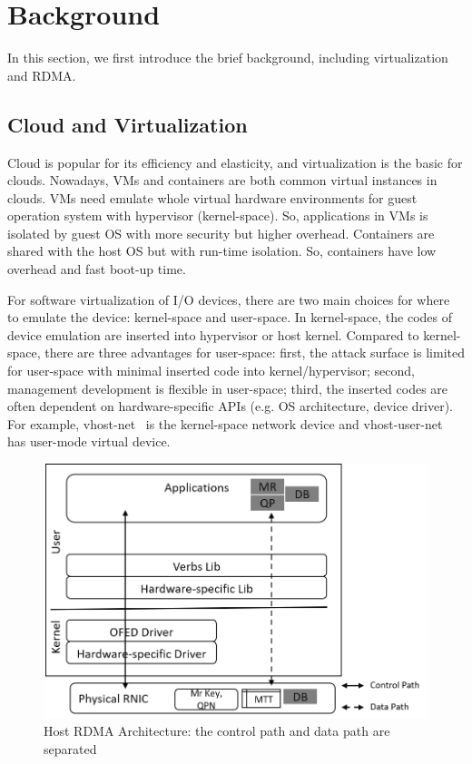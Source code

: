 \section{Background}
In this section, we first introduce the brief background, including virtualization and RDMA. 

\subsection{Cloud and Virtualization}
Cloud is popular for its efficiency and elasticity, and virtualization is the basic for clouds. Nowadays, VMs and containers are both common virtual instances in clouds. VMs need emulate whole virtual hardware environments for guest operation system with hypervisor (kernel-space). So, applications in VMs is isolated by guest OS with more security but higher overhead. Containers are shared with the host OS but with run-time isolation. So, containers have low overhead and fast boot-up time.

For software virtualization of I/O devices, there are two main choices for where to emulate the device: kernel-space and user-space. In kernel-space, the codes of device emulation are inserted into hypervisor or host kernel. Compared to kernel-space, there are three advantages for user-space: first, the attack surface is limited for user-space with minimal inserted code into kernel/hypervisor; second, management development is flexible in user-space; third, the inserted codes are often dependent on hardware-specific APIs (e.g. OS architecture, device driver). For example, vhost-net~\cite{vhost-net} is the kernel-space network device and vhost-user-net~\cite{vhost-user-net} has user-mode virtual device. 

\begin{figure}[!ht]
\centering
\includegraphics[width=0.8\linewidth]{images/rdma-feat.png}
\caption{Host RDMA Architecture: the control path and data path are separated}
\label{fig:rdma-feat}
\end{figure}

